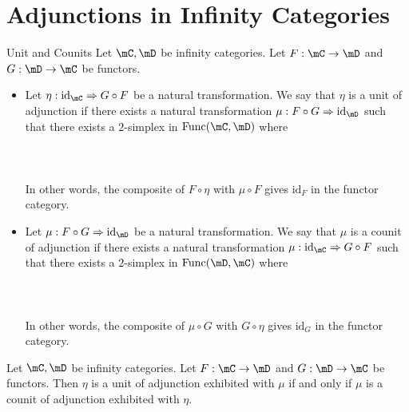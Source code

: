 \documentclass[a4paper]{article}
\begin{document}
\section{Adjunctions in Infinity Categories}
\begin{defn}{Unit and Counits}{} Let $\mC,\mD$ be infinity categories. Let $F:\mC\to\mD$ and $G:\mD\to\mC$ be functors. 
\begin{itemize}
\item Let $\eta:\text{id}_\mC\Rightarrow G\circ F$ be a natural transformation. We say that $\eta$ is a unit of adjunction if there exists a natural transformation $\mu:F\circ G\Rightarrow\text{id}_\mD$ such that there exists a $2$-simplex in $\text{Func}(\mC,\mD)$ where \\~\\
\\~\\
In other words, the composite of $F\circ\eta$ with $\mu\circ F$ gives $\text{id}_F$ in the functor category. 
\item Let $\mu:F\circ G\Rightarrow\text{id}_\mD$ be a natural transformation. We say that $\mu$ is a counit of adjunction if there exists a natural transformation $\mu:\text{id}_\mC\Rightarrow G\circ F$ such that there exists a $2$-simplex in $\text{Func}(\mD,\mC)$ where \\~\\
\\~\\
In other words, the composite of $\mu\circ G$ with $G\circ\eta$ gives $\text{id}_G$ in the functor category. 
\end{itemize}
\end{defn}

\begin{lmm}{}{} Let $\mC,\mD$ be infinity categories. Let $F:\mC\to\mD$ and $G:\mD\to\mC$ be functors. Then $\eta$ is a unit of adjunction exhibited with $\mu$ if and only if $\mu$ is a counit of adjunction exhibited with $\eta$. 
\end{lmm}
\end{document}
